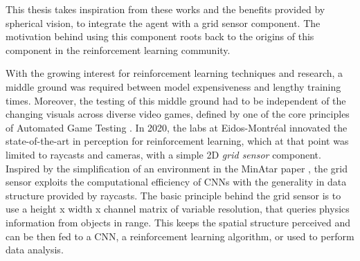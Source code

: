 
This thesis takes inspiration from these works and the benefits provided by spherical vision, to integrate the agent with a grid sensor component.
The motivation behind using this component roots back to the origins of this component in the reinforcement learning community. 

With the growing interest for reinforcement learning techniques and research, a middle ground was required between model expensiveness and lengthy training times. Moreover, the testing of this middle ground had to be independent of the changing visuals across diverse video games, defined by one of the core principles of Automated Game Testing \cite{unity-eidosmontreal2020}. 
In 2020, the labs at Eidos-Montréal \cite{unity-eidosmontreal2020} innovated the state-of-the-art in perception for reinforcement learning, which at that point was limited to raycasts and cameras, with a simple 2D \textit{grid sensor} component. Inspired by the simplification of an environment in the MinAtar paper \cite{young2019minatar}, the grid sensor exploits the computational efficiency of CNNs with the generality in data structure provided by raycasts. The basic principle behind the grid sensor is to use a height x width x channel matrix of variable resolution, that queries physics information from objects in range. This keeps the spatial structure perceived and can be then fed to a CNN, a reinforcement learning algorithm, or used to perform data analysis. 



